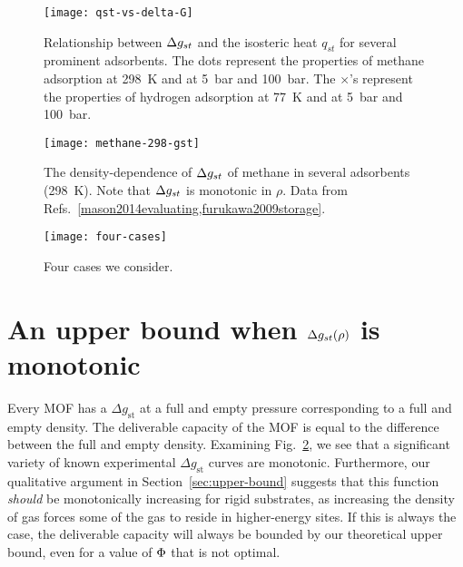 

\begin{figure}
    \centering
    \texttt{[image: qst-vs-delta-G]}
    \caption{Relationship between $\Delta g_{st}$ and the isosteric heat $q_{st}$ for several prominent adsorbents. The dots represent the properties of methane adsorption at 298\ K and at 5\ bar and 100\ bar. The $\times$'s represent the properties of hydrogen adsorption at 77\ K and at 5~bar and 100~bar.}
    \label{fig:qst-vs-delta-G}
\end{figure}

\begin{figure}
    \centering
    \texttt{[image: methane-298-gst]}
    \caption{The density-dependence of $\Delta g_{st}$ of methane in several adsorbents (298\ K). Note that $\Delta g_{st}$ is monotonic in $\rho$. Data from Refs.~\ref{mason2014evaluating,furukawa2009storage}.
    }
    \label{fig:methane-gst}
\end{figure}

\begin{figure}
    \centering
    \texttt{[image: four-cases]}
    \caption{Four cases we consider.}
    \label{fig:delta-gst-maximum}
\end{figure}

\section{An upper bound when $\Delta g_{st}(\rho)$ is monotonic}\label{sec:monotonic}
Every MOF has a $\Delta g_\text{st}$ at a full and empty pressure corresponding to a full and empty density. The deliverable capacity of the MOF is equal to the difference between the full and empty density.
Examining Fig.~\ref{fig:methane-gst}, we see that a significant variety of known experimental $\Delta g_\text{st}$ curves are monotonic.  Furthermore, our qualitative argument in Section~\ref{sec:upper-bound} suggests that this function \emph{should} be monotonically increasing for rigid substrates, as increasing the density of gas forces some of the gas to reside in higher-energy sites.  If this is always the case, the deliverable capacity will always be bounded by our theoretical upper bound, even for a value of $\Phi$ that is not optimal.

